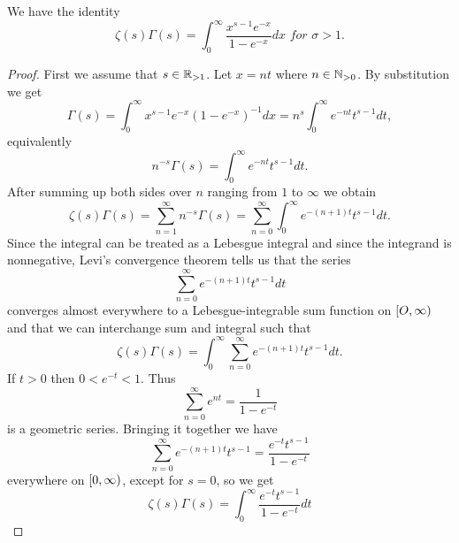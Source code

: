 \begin{theorem}
	We have the identity
\begin{equation}
	\zeta(s)\Gamma(s) = \int _0 ^\infty \frac{x^{s - 1} e^{-x}}{1 - e^{-x}} dx \textit{ for } \sigma > 1.
\end{equation}
\end{theorem}
\begin{proof}
	First we assume that $s \in \mathbb{R}_{> 1}$. Let $x = n t$ where $n \in \mathbb{N}_{> 0}$. By substitution we get
\begin{equation*}
	\Gamma(s) = \int _0 ^{\infty} x^{s - 1} e^{-x} (1 - e^{-x})^{-1} dx = n^s \int _0 ^\infty e^{-n t} t^{s - 1} dt,
\end{equation*}
equivalently
\begin{equation*}
	n^{-s} \Gamma(s) = \int _0 ^\infty e^{-n t} t^{s - 1} dt.
\end{equation*}
	After summing up both sides over $n$ ranging from $1$ to $\infty$ we obtain
\begin{equation*}
	\zeta(s) \Gamma(s) = \sum _{n=1} ^\infty n^{-s} \Gamma(s) = \sum _{n=0} ^\infty \int _0 ^\infty e^{-(n + 1) t} t^{s - 1} dt.
\end{equation*}
	Since the integral can be treated as a Lebesgue integral and since the integrand is nonnegative, Levi’s convergence theorem tells us that the series
\begin{equation*}
	\sum _{n=0} ^\infty e^{-(n + 1) t} t^{s - 1} dt
\end{equation*}
	converges almost everywhere to a Lebesgue-integrable sum function on $\left[O, \infty\right)$ and that we can interchange sum and integral such that
\begin{equation*}
	\zeta(s) \Gamma(s) = \int _0 ^\infty \sum _{n = 0} ^\infty e^{-(n + 1) t} t^{s - 1} dt.
\end{equation*}
	If $t > 0$ then $0 < e^{-t} < 1$. Thus
\begin{equation*}
	\sum _{n = 0} ^\infty e^{n t} = \frac{1}{1 - e^{-t}}
\end{equation*}
	is a geometric series. Bringing it together we have
\begin{equation*}
	\sum _{n=0} ^\infty e^{-(n + 1) t} t^{s - 1} = \frac{e^{-t} t^{s - 1}}{1 - e^{-t}}
\end{equation*}
	everywhere on $\left[0, \infty\right)$, except for $s = 0$, so we get
\begin{equation*}
	\zeta(s) \Gamma(s) = \int _0 ^\infty \frac{e^{-t} t^{s - 1}}{1 - e^{-t}} dt
\end{equation*}

\end{proof}
